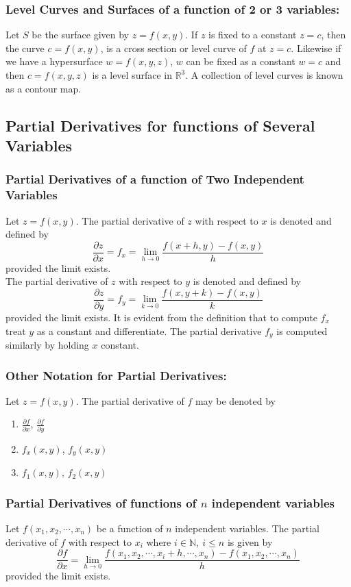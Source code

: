 \documentclass[14pt]{article}
\begin{document}
    \subsubsection{Level Curves and Surfaces of a function of 2 or 3 variables:}
    Let $S$ be the surface given by $z=f(x,y)$. If $z$ is fixed to a
    constant $z=c$, then the curve $c=f(x,y)$, is a cross section or
    level curve of $f$ at $z=c$. Likewise if we have a hypersurface
    $w=f(x,y,z)$, $w$ can be fixed as a constant $w=c$ and then
    $c=f(x,y,z)$ is a level surface in $\mathbb{R}^3$. A collection of
    level curves is known as a contour map.
    \subsection{Partial Derivatives for functions of Several Variables}
    \subsubsection{Partial Derivatives of a function of Two Independent Variables}
    Let $z=f(x,y)$. The partial derivative of $z$ with respect to $x$ is
    denoted and defined by
    $$\frac{\partial z}{\partial x}=f_x=\lim\limits_{h\rightarrow
    0}\frac{f(x+h, y)-f(x,y)}{h}$$ provided the limit exists.\\
    The partial derivative of $z$ with respect to $y$ is denoted and
    defined by
    $$\frac{\partial z}{\partial y}=f_y=\lim\limits_{k\rightarrow
    0}\frac{f(x, y+k)-f(x,y)}{k}$$ provided the limit exists. It is
    evident from the definition that to compute $f_x$ treat $y$ as a
    constant and differentiate. The partial derivative $f_y$ is computed
    similarly by holding $x$ constant.
    \subsubsection{Other Notation for Partial Derivatives:}
    Let $z=f(x,y)$. The partial derivative of $f$ may be denoted by
    \begin{enumerate}
        \item $\frac{\partial f}{\partial x}$, $\frac{\partial
        f}{\partial y}$
        \item $f_x(x,y)$, $f_y(x,y)$
        \item $f_1(x,y)$, $f_2(x,y)$
    \end{enumerate} 
    \subsubsection{Partial Derivatives of functions of $n$ independent variables}
    Let $f(x_1, x_2, \cdots, x_n)$ be a function of $n$ independent
    variables. The partial derivative of $f$ with respect to $x_i$ where
    $i\in \mathbb{N},\ i\leq n$ is given by
    $$\frac{\partial f}{\partial x}=\lim\limits_{h\rightarrow
    0}\frac{f(x_1, x_2, \cdots, x_i+h, \cdots, x_n)-f(x_1, x_2, \cdots,
    x_n)}{h}$$ provided the limit exists.
\end{document}
